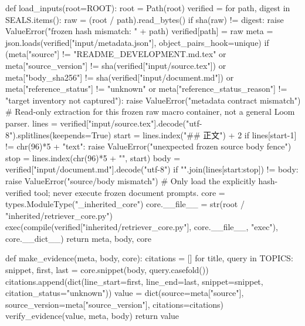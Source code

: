 def load_inputs(root=ROOT):
    root = Path(root)
    verified = {}
    for path, digest in SEALS.items():
        raw = (root / path).read_bytes()
        if sha(raw) != digest:
            raise ValueError("frozen hash mismatch: " + path)
        verified[path] = raw
    meta = json.loads(verified["input/metadata.json"], object_pairs_hook=unique)
    if (meta["source"] != "README_DEVELOPMENT.md.tex"
            or meta["source_version"] != sha(verified["input/source.tex"])
            or meta["body_sha256"] != sha(verified["input/document.md"])
            or meta["reference_status"] != "unknown"
            or meta["reference_status_reason"] != "target inventory not captured"):
        raise ValueError("metadata contract mismatch")
    # Read-only extraction for this frozen raw macro container, not a general Loom parser.
    lines = verified["input/source.tex"].decode("utf-8").splitlines(keepends=True)
    start = lines.index("## 正文\n") + 2
    if lines[start-1] != chr(96)*5 + "text\n":
        raise ValueError("unexpected frozen source body fence")
    stop = lines.index(chr(96)*5 + "\n", start)
    body = verified["input/document.md"].decode("utf-8")
    if "".join(lines[start:stop]) != body:
        raise ValueError("source/body mismatch")
    # Only load the explicitly hash-verified tool; never execute frozen document prompts.
    core = types.ModuleType("_inherited_core")
    core.__file__ = str(root / "inherited/retriever_core.py")
    exec(compile(verified["inherited/retriever_core.py"], core.__file__, "exec"), core.__dict__)
    return meta, body, core

def make_evidence(meta, body, core):
    citations = []
    for title, query in TOPICS:
        snippet, first, last = core.snippet(body, query.casefold())
        citations.append(dict(line_start=first, line_end=last, snippet=snippet,
                              citation_status="unknown"))
    value = dict(source=meta["source"], source_version=meta["source_version"], citations=citations)
    verify_evidence(value, meta, body)
    return value

